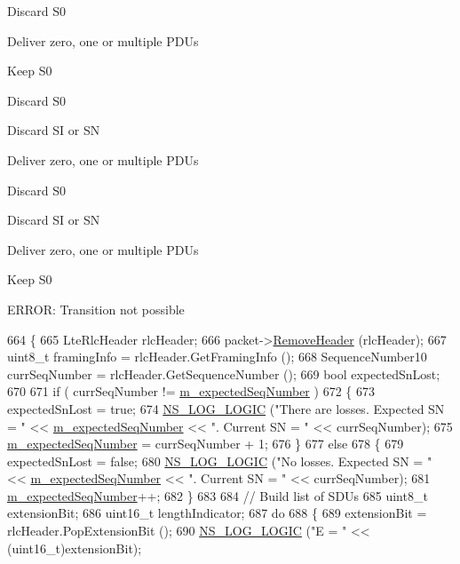 Discard S0

Deliver zero, one or multiple P\+D\+Us

Keep S0

Discard S0

Discard SI or SN

Deliver zero, one or multiple P\+D\+Us

Discard S0

Discard SI or SN

Deliver zero, one or multiple P\+D\+Us

Keep S0

E\+R\+R\+OR\+: Transition not possible
\begin{DoxyCode}
664 \{
665   LteRlcHeader rlcHeader;
666   packet->\hyperlink{classns3_1_1Packet_a0961eccf975d75f902d40956c93ba63e}{RemoveHeader} (rlcHeader);
667   uint8\_t framingInfo = rlcHeader.GetFramingInfo ();
668   SequenceNumber10 currSeqNumber = rlcHeader.GetSequenceNumber ();
669   \textcolor{keywordtype}{bool} expectedSnLost;
670 
671   \textcolor{keywordflow}{if} ( currSeqNumber != \hyperlink{classns3_1_1LteRlcUmLowLat_aa1523ceabc0b0aaf4865b2e30e4ce47c}{m\_expectedSeqNumber} )
672     \{
673       expectedSnLost = \textcolor{keyword}{true};
674       \hyperlink{group__logging_ga88acd260151caf2db9c0fc84997f45ce}{NS\_LOG\_LOGIC} (\textcolor{stringliteral}{"There are losses. Expected SN = "} << 
      \hyperlink{classns3_1_1LteRlcUmLowLat_aa1523ceabc0b0aaf4865b2e30e4ce47c}{m\_expectedSeqNumber} << \textcolor{stringliteral}{". Current SN = "} << currSeqNumber);
675       \hyperlink{classns3_1_1LteRlcUmLowLat_aa1523ceabc0b0aaf4865b2e30e4ce47c}{m\_expectedSeqNumber} = currSeqNumber + 1;
676     \}
677   \textcolor{keywordflow}{else}
678     \{
679       expectedSnLost = \textcolor{keyword}{false};
680       \hyperlink{group__logging_ga88acd260151caf2db9c0fc84997f45ce}{NS\_LOG\_LOGIC} (\textcolor{stringliteral}{"No losses. Expected SN = "} << 
      \hyperlink{classns3_1_1LteRlcUmLowLat_aa1523ceabc0b0aaf4865b2e30e4ce47c}{m\_expectedSeqNumber} << \textcolor{stringliteral}{". Current SN = "} << currSeqNumber);
681       \hyperlink{classns3_1_1LteRlcUmLowLat_aa1523ceabc0b0aaf4865b2e30e4ce47c}{m\_expectedSeqNumber}++;
682     \}
683 
684   \textcolor{comment}{// Build list of SDUs}
685   uint8\_t extensionBit;
686   uint16\_t lengthIndicator;
687   \textcolor{keywordflow}{do}
688     \{
689       extensionBit = rlcHeader.PopExtensionBit ();
690       \hyperlink{group__logging_ga88acd260151caf2db9c0fc84997f45ce}{NS\_LOG\_LOGIC} (\textcolor{stringliteral}{"E = "} << (uint16\_t)extensionBit);

\end{DoxyCode}
